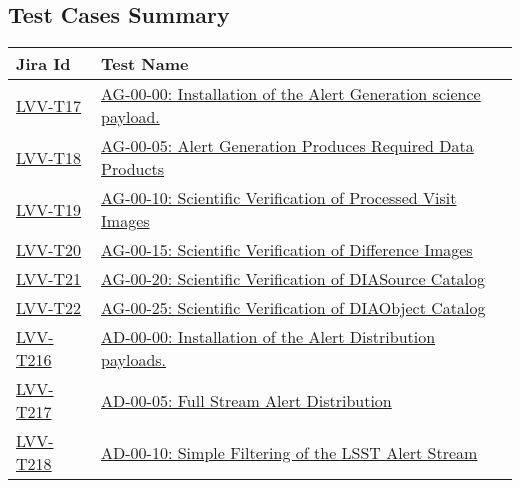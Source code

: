 \subsection{Test Cases Summary}\label{test-cases-summary}

\begin{longtable}[]{p{3cm}p{13cm}}
\toprule
Jira Id & Test Name\tabularnewline
\midrule
\endhead
\protect\hyperlink{lvv-t17---ag-00-00-installation-of-the-alert-generation-science-payload}{LVV-T17}
&
\href{https://jira.lsstcorp.org/secure/Tests.jspa\#/testCase/LVV-T17}{AG-00-00:
Installation of the Alert Generation science payload.}\tabularnewline
\protect\hyperlink{lvv-t18---ag-00-05-alert-generation-produces-required-data-products}{LVV-T18}
&
\href{https://jira.lsstcorp.org/secure/Tests.jspa\#/testCase/LVV-T18}{AG-00-05:
Alert Generation Produces Required Data Products}\tabularnewline
\protect\hyperlink{lvv-t19---ag-00-10-scientific-verification-of-processed-visit-images}{LVV-T19}
&
\href{https://jira.lsstcorp.org/secure/Tests.jspa\#/testCase/LVV-T19}{AG-00-10:
Scientific Verification of Processed Visit Images}\tabularnewline
\protect\hyperlink{lvv-t20---ag-00-15-scientific-verification-of-difference-images}{LVV-T20}
&
\href{https://jira.lsstcorp.org/secure/Tests.jspa\#/testCase/LVV-T20}{AG-00-15:
Scientific Verification of Difference Images}\tabularnewline
\protect\hyperlink{lvv-t21---ag-00-20-scientific-verification-of-diasource-catalog}{LVV-T21}
&
\href{https://jira.lsstcorp.org/secure/Tests.jspa\#/testCase/LVV-T21}{AG-00-20:
Scientific Verification of DIASource Catalog}\tabularnewline
\protect\hyperlink{lvv-t22---ag-00-25-scientific-verification-of-diaobject-catalog}{LVV-T22}
&
\href{https://jira.lsstcorp.org/secure/Tests.jspa\#/testCase/LVV-T22}{AG-00-25:
Scientific Verification of DIAObject Catalog}\tabularnewline
\protect\hyperlink{lvv-t216---ad-00-00-installation-of-the-alert-distribution-payloads}{LVV-T216}
&
\href{https://jira.lsstcorp.org/secure/Tests.jspa\#/testCase/LVV-T216}{AD-00-00:
Installation of the Alert Distribution payloads.}\tabularnewline
\protect\hyperlink{lvv-t217---ad-00-05-full-stream-alert-distribution}{LVV-T217}
&
\href{https://jira.lsstcorp.org/secure/Tests.jspa\#/testCase/LVV-T217}{AD-00-05:
Full Stream Alert Distribution}\tabularnewline
\protect\hyperlink{lvv-t218---ad-00-10-simple-filtering-of-the-lsst-alert-stream}{LVV-T218}
&
\href{https://jira.lsstcorp.org/secure/Tests.jspa\#/testCase/LVV-T218}{AD-00-10:
Simple Filtering of the LSST Alert Stream}\tabularnewline
\bottomrule
\end{longtable}

